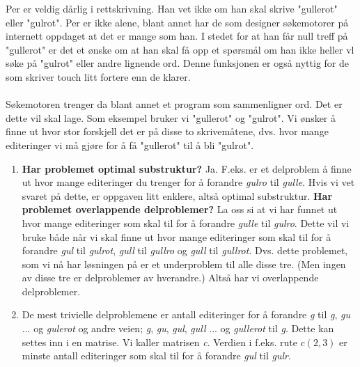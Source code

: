 \begin{boxed}
Per er veldig dårlig i rettskrivning. Han vet ikke om han skal skrive "gullerot" eller "gulrot". Per er ikke alene, blant annet har de som designer søkemotorer på internett oppdaget at det er mange som han. I stedet for at han får null treff på "gullerot" er det et ønske om at han skal få opp et spørsmål om han ikke heller vl søke på "gulrot" eller andre lignende ord. Denne funksjonen er også nyttig for de som skriver touch litt fortere enn de klarer.
\\\\
Søkemotoren trenger da blant annet et program som sammenligner ord. Det er dette vil skal lage. Som eksempel bruker vi "gullerot" og "gulrot". Vi ønsker å finne ut hvor stor forskjell det er på disse to skrivemåtene, dvs. hvor mange editeringer vi må gjøre for å få "gullerot" til å bli "gulrot". 

\begin{enumerate}
    \item \textbf{Har problemet optimal substruktur?} Ja. F.eks. er et delproblem å finne ut hvor mange editeringer du trenger for å forandre \textit{gulro} til \textit{gulle}. Hvis vi vet svaret på dette, er oppgaven litt enklere, altså optimal substruktur.\newline
    \textbf{Har problemet overlappende delproblemer?} La oss si at vi har funnet ut hvor mange editeringer som skal til for å forandre \textit{gulle} til \textit{gulro}. Dette vil vi bruke både når vi skal finne ut hvor mange editeringer som skal til for å forandre \textit{gul} til \textit{gulrot}, \textit{gull} til \textit{gullro} og \textit{gull} til \textit{gullrot}. Dvs. dette problemet, som vi nå har løsningen på er et underproblem til alle disse tre. (Men ingen av disse tre er delproblemer av hverandre.) Altså har vi overlappende delproblemer.
    
    \item De mest trivielle delproblemene er antall editeringer for å forandre \textit{g} til \textit{g}, \textit{gu} ... og \textit{gulerot} og andre veien; \textit{g}, \textit{gu}, \textit{gul}, \textit{gull} ... og \textit{gullerot} til \textit{g}.\newline
    \newline
    Dette kan settes inn i en matrise. Vi kaller matrisen \textit{c}. Verdien i f.eks. rute $c(2,3)$ er minste antall editeringer som skal til for å forandre \textit{gul} til \textit{gulr}.
    

\end{enumerate}
\end{boxed}
